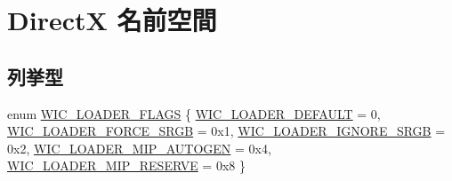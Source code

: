 \hypertarget{namespace_direct_x}{}\section{DirectX 名前空間}
\label{namespace_direct_x}
\subsection*{列挙型}
\begin{DoxyCompactItemize}
\item 
enum \mbox{\hyperlink{namespace_direct_x_ad1ef6b84995b08da5a29130bd8cc5c2a}{W\+I\+C\+\_\+\+L\+O\+A\+D\+E\+R\+\_\+\+F\+L\+A\+GS}} \{ \newline
\mbox{\hyperlink{namespace_direct_x_ad1ef6b84995b08da5a29130bd8cc5c2aa31db232209a0c414f3c5dd3f36fad240}{W\+I\+C\+\_\+\+L\+O\+A\+D\+E\+R\+\_\+\+D\+E\+F\+A\+U\+LT}} = 0, 
\mbox{\hyperlink{namespace_direct_x_ad1ef6b84995b08da5a29130bd8cc5c2aa19253126a33109ad1e9ca15710a48a71}{W\+I\+C\+\_\+\+L\+O\+A\+D\+E\+R\+\_\+\+F\+O\+R\+C\+E\+\_\+\+S\+R\+GB}} = 0x1, 
\mbox{\hyperlink{namespace_direct_x_ad1ef6b84995b08da5a29130bd8cc5c2aaa411d70404895e65f12c2e6f4216636c}{W\+I\+C\+\_\+\+L\+O\+A\+D\+E\+R\+\_\+\+I\+G\+N\+O\+R\+E\+\_\+\+S\+R\+GB}} = 0x2, 
\mbox{\hyperlink{namespace_direct_x_ad1ef6b84995b08da5a29130bd8cc5c2aa84a4f743184a5fb4df457fe60fafc52a}{W\+I\+C\+\_\+\+L\+O\+A\+D\+E\+R\+\_\+\+M\+I\+P\+\_\+\+A\+U\+T\+O\+G\+EN}} = 0x4, 
\newline
\mbox{\hyperlink{namespace_direct_x_ad1ef6b84995b08da5a29130bd8cc5c2aaf71b74a0a22ed2bbf9cfe2e005b32ac2}{W\+I\+C\+\_\+\+L\+O\+A\+D\+E\+R\+\_\+\+M\+I\+P\+\_\+\+R\+E\+S\+E\+R\+VE}} = 0x8
 \}
\end{DoxyCompactItemize}
